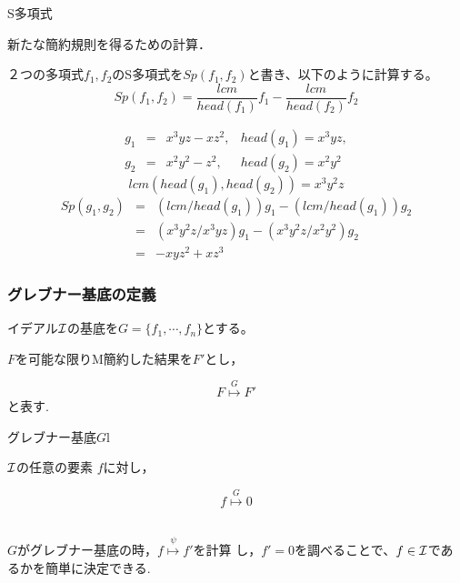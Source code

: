 \documentclass[dvipdfmx,11pt,notheorems]{beamer}
\theoremstyle{definition}
\begin{document}
\begin{frame}
\begin{block}{S多項式}

新たな簡約規則を得るための計算．

２つの多項式$f_1,f_2$のS多項式を$Sp(f_1,f_2)$と書き、以下のように計算する。
\[
Sp(f_1,f_2)= \frac{lcm}{head(f_1)} f_1 - \frac{lcm}{head(f_2)}f_2 
\]
\end{block}

\begin{exampleblock}{}
 \[
 \begin{array}{lcrr}
 g_1 & = & x^3yz - xz^2, & head(g_1) = x^3yz,\\
 g_2 & = & x^2y^2 - z^2, & head(g_2) = x^2y^2
 \end{array}
 \]
 \[
 lcm(head(g_1), head(g_2)) = x^3y^2z
 \]
 \[
 \begin{array}{lcr} 
  Sp(g_1,g_2) & = & ( lcm / head(g_1) ) g_1 - ( lcm / head(g_1)) g_2 \\
  & = & ( x^3y^2z / x^3yz ) g_1 - ( x^3y^2z / x^2y^2 ) g_2 \\
  & = & -xyz^2 + xz^3
 \end{array}
\]
\end{exampleblock}
\end{frame}

\begin{frame}\frametitle{グレブナー基底の定義}

イデアル${\cal I}$の基底を$ G = \{ f_1,\cdots,f_n \} $とする。

$F$を可能な限りM簡約した結果を$F'$とし，

\[F \stackrel{G}{\longmapsto} F' \] と表す.

\begin{block}{グレブナー基底$ G $l}

${\cal I}$の任意の要素 $f$に対し，

\[
	f \stackrel{G}{\longmapsto} 0 
\]
\end{block}
\ \\
$ G $がグレブナー基底の時，$f \stackrel{\psi}{\longmapsto} f' $を計算
し，$f'=0$を調べることで、$f \in {\cal I}$であるかを簡単に決定できる.
\end{frame}
\end{document}
